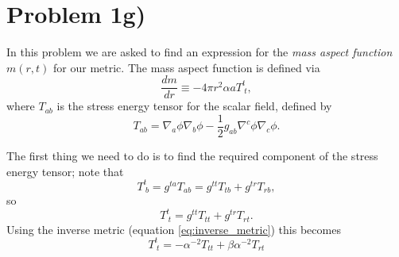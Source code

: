 \documentclass[12pt]{article}
\numberwithin{equation}{section}
\begin{document}
\section{Problem 1g)}
In this problem we are asked to find an expression for the \textit{mass aspect function} $m(r, t)$ for our metric.  The mass aspect function is defined via
\begin{equation}
\frac{d m}{d r} \equiv - 4 \pi r^2 \alpha a T^t_{~t}, 
\end{equation}
where $T_{ab}$ is the stress energy tensor for the scalar field, defined by
\begin{equation}
T_{ab} = \nabla_a \phi \nabla_b \phi - \frac{1}{2} g_{ab} \nabla^c \phi \nabla_c \phi.
\end{equation}

The first thing we need to do is to find the required component of the stress energy tensor; note that
\begin{equation*}
T^{t}_{~b} = g^{ta} T_{ab} = g^{tt} T_{tb} + g^{tr} T_{rb},
\end{equation*}
so
\begin{equation*}
T^{t}_{~t} = g^{tt} T_{tt} + g^{tr} T_{rt}.
\end{equation*}
Using the inverse metric (equation \ref{eq:inverse_metric}) this becomes
\begin{equation}
T^{t}_{~t} = -\alpha^{-2} T_{tt} + \beta \alpha^{-2} T_{rt}
\end{equation}
\end{document}
